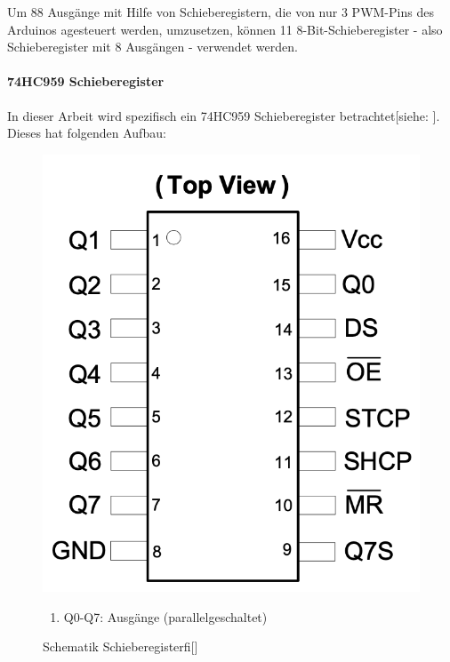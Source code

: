 Um 88 Ausgänge mit Hilfe von Schieberegistern, die von nur 3 \ac{PWM}-Pins des Arduinos agesteuert werden, umzusetzen,
können 11 8-Bit-Schieberegister  - also Schieberegister mit 8 Ausgängen - verwendet werden.

\paragraph{74HC959 Schieberegister}
In dieser Arbeit wird spezifisch ein 74HC959 Schieberegister betrachtet[siehe: \cite*[siehe ][]{DatasheetSchieberegister74HC595}].
Dieses hat folgenden Aufbau:
\begin{figure}[htbp]
\begin{minipage}{0.4\textwidth}
		\includegraphics [width=1\textwidth] {img/Schieberegister}
		\caption{Schematik Schieberegisterﬁ[\cite*[siehe ][]{DatasheetSchieberegister74HC595}]}
		\label{img:Shift}
\end{minipage}
\begin{minipage}{0.6\textwidth}
	\begin{enumerate}
		\item Q0-Q7: Ausgänge (parallelgeschaltet)

\end{enumerate}
\end{minipage}
\end{figure}

